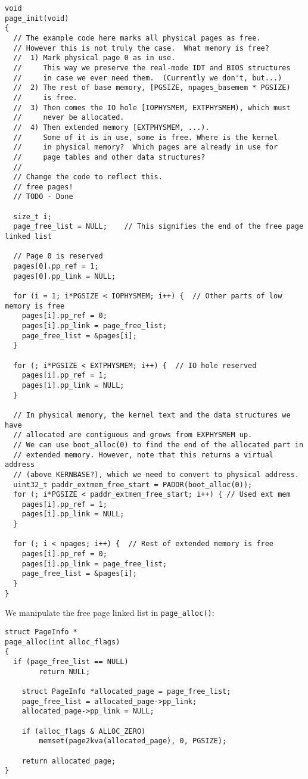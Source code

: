 \documentclass[]{article}
\begin{document}
\begin{verbatim}
void
page_init(void)
{
  // The example code here marks all physical pages as free.
  // However this is not truly the case.  What memory is free?
  //  1) Mark physical page 0 as in use.
  //     This way we preserve the real-mode IDT and BIOS structures
  //     in case we ever need them.  (Currently we don't, but...)
  //  2) The rest of base memory, [PGSIZE, npages_basemem * PGSIZE)
  //     is free.
  //  3) Then comes the IO hole [IOPHYSMEM, EXTPHYSMEM), which must
  //     never be allocated.
  //  4) Then extended memory [EXTPHYSMEM, ...).
  //     Some of it is in use, some is free. Where is the kernel
  //     in physical memory?  Which pages are already in use for
  //     page tables and other data structures?
  //
  // Change the code to reflect this.
  // free pages!
  // TODO - Done

  size_t i;
  page_free_list = NULL;	// This signifies the end of the free page linked list

  // Page 0 is reserved
  pages[0].pp_ref = 1;
  pages[0].pp_link = NULL;

  for (i = 1; i*PGSIZE < IOPHYSMEM; i++) {	// Other parts of low memory is free
    pages[i].pp_ref = 0;
    pages[i].pp_link = page_free_list;
    page_free_list = &pages[i];
  }

  for (; i*PGSIZE < EXTPHYSMEM; i++) {	// IO hole reserved
    pages[i].pp_ref = 1;
    pages[i].pp_link = NULL;
  }

  // In physical memory, the kernel text and the data structures we have
  // allocated are contiguous and grows from EXPHYSMEM up.
  // We can use boot_alloc(0) to find the end of the allocated part in
  // extended memory. However, note that this returns a virtual address
  // (above KERNBASE?), which we need to convert to physical address.
  uint32_t paddr_extmem_free_start = PADDR(boot_alloc(0));
  for (; i*PGSIZE < paddr_extmem_free_start; i++) { // Used ext mem
    pages[i].pp_ref = 1;
    pages[i].pp_link = NULL;
  }

  for (; i < npages; i++) {  // Rest of extended memory is free
    pages[i].pp_ref = 0;
    pages[i].pp_link = page_free_list;
    page_free_list = &pages[i];
  }
}
\end{verbatim}

We manipulate the free page linked list in \verb|page_alloc()|:

\begin{verbatim}
struct PageInfo *
page_alloc(int alloc_flags)
{	
  if (page_free_list == NULL)
		return NULL;

	struct PageInfo *allocated_page = page_free_list;
	page_free_list = allocated_page->pp_link;
	allocated_page->pp_link = NULL;

	if (alloc_flags & ALLOC_ZERO)
		memset(page2kva(allocated_page), 0, PGSIZE);

	return allocated_page;
}
\end{verbatim}
\end{document}
